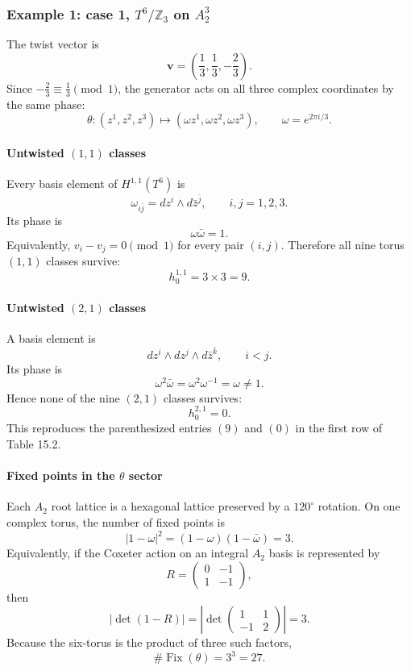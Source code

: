 \documentclass[
  10pt,
  a4paper,
  openany]{book}
\begin{document}
\subsubsection{\texorpdfstring{Example 1: case 1, \(T^6/\mathbb Z_3\) on
\(A_2^3\)}{Example 1: case 1, T\^{}6/\textbackslash mathbb Z\_3 on A\_2\^{}3}}\label{example-1-case-1-t6mathbb-z_3-on-a_23}

The twist vector is \[
\mathbf v
=
\left(\frac13,\frac13,-\frac23\right).
\] Since \(-\frac23\equiv\frac13\pmod1\), the generator acts on all
three complex coordinates by the same phase: \[
\theta:(z^1,z^2,z^3)
\longmapsto
(\omega z^1,\omega z^2,\omega z^3),
\qquad
\omega=e^{2\pi i/3}.
\]

\paragraph{\texorpdfstring{Untwisted \((1,1)\)
classes}{Untwisted (1,1) classes}}\label{untwisted-11-classes}

Every basis element of \(H^{1,1}(T^6)\) is \[
\omega_{i\bar j}
=dz^i\wedge d\bar z^{\bar j},
\qquad
i,j=1,2,3.
\] Its phase is \[
\omega\bar\omega=1.
\] Equivalently, \(v_i-v_j=0\pmod1\) for every pair \((i,j)\). Therefore
all nine torus \((1,1)\) classes survive: \[
\boxed{h_0^{1,1}=3\times3=9}.
\]

\paragraph{\texorpdfstring{Untwisted \((2,1)\)
classes}{Untwisted (2,1) classes}}\label{untwisted-21-classes}

A basis element is \[
dz^i\wedge dz^j\wedge d\bar z^{\bar k},
\qquad i<j.
\] Its phase is \[
\omega^2\bar\omega
=\omega^2\omega^{-1}
=\omega\neq1.
\] Hence none of the nine \((2,1)\) classes survives: \[
\boxed{h_0^{2,1}=0}.
\] This reproduces the parenthesized entries \((9)\) and \((0)\) in the
first row of Table 15.2.

\paragraph{\texorpdfstring{Fixed points in the \(\theta\)
sector}{Fixed points in the \textbackslash theta sector}}\label{fixed-points-in-the-theta-sector}

Each \(A_2\) root lattice is a hexagonal lattice preserved by a
\(120^\circ\) rotation. On one complex torus, the number of fixed points
is \[
\left|1-\omega\right|^2
=
(1-\omega)(1-\bar\omega)
=3.
\] Equivalently, if the Coxeter action on an integral \(A_2\) basis is
represented by \[
R=
\begin{pmatrix}
0&-1\\
1&-1
\end{pmatrix},
\] then \[
\left|\det(1-R)\right|
=
\left|
\det
\begin{pmatrix}
1&1\\
-1&2
\end{pmatrix}
\right|
=3.
\] Because the six-torus is the product of three such factors, \[
\#\operatorname{Fix}(\theta)
=3^3
=27.
\]
\end{document}
